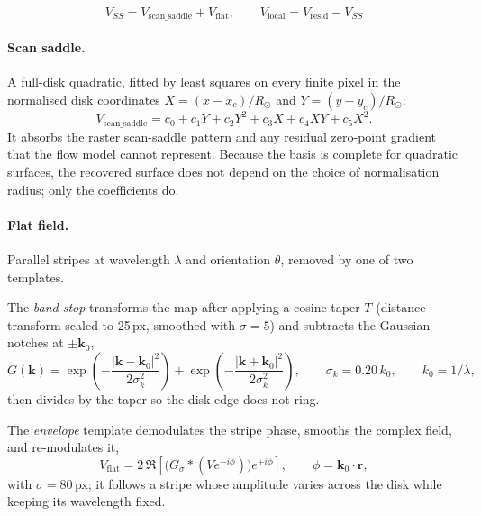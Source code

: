 \documentclass[11pt,a4paper]{article}
\begin{document}
\begin{equation}
  \boxed{\;V_{SS} = V_{\mathrm{scan\_saddle}} + V_{\mathrm{flat}},
  \qquad V_{\mathrm{local}} = V_{\mathrm{resid}} - V_{SS}\;}
  \label{eq:ss}
\end{equation}

\paragraph{Scan saddle.}  A full-disk quadratic, fitted by least squares on every
finite pixel in the normalised disk coordinates
$X=(x-x_c)/R_\odot$ and $Y=(y-y_c)/R_\odot$:
\begin{equation}
  V_{\mathrm{scan\_saddle}} = c_0 + c_1 Y + c_2 Y^2 + c_3 X + c_4 XY + c_5 X^2 .
\end{equation}
It absorbs the raster scan-saddle pattern and any residual zero-point gradient
that the flow model cannot represent.  Because the basis is complete for
quadratic surfaces, the recovered surface does not depend on the choice of
normalisation radius; only the coefficients do.

\paragraph{Flat field.}  Parallel stripes at wavelength $\lambda$ and
orientation $\theta$, removed by one of two templates.

The \emph{band-stop} transforms the map after applying a cosine taper
$T$ (distance transform scaled to 25\,px, smoothed with $\sigma=5$) and
subtracts the Gaussian notches at $\pm \bm{k}_0$,
\begin{equation}
  G(\bm{k}) = \exp\!\left(-\frac{|\bm{k}-\bm{k}_0|^2}{2\sigma_k^2}\right)
            + \exp\!\left(-\frac{|\bm{k}+\bm{k}_0|^2}{2\sigma_k^2}\right),
  \qquad \sigma_k = 0.20\,k_0,
  \qquad k_0 = 1/\lambda,
\end{equation}
then divides by the taper so the disk edge does not ring.

The \emph{envelope} template demodulates the stripe phase, smooths the complex
field, and re-modulates it,
\begin{equation}
  V_{\mathrm{flat}} = 2\,\Re\!\left[
    \big(G_{\sigma} * (V e^{-i\phi})\big) e^{+i\phi}\right],
  \qquad \phi = \bm{k}_0\cdot\bm{r},
\end{equation}
with $\sigma = 80$\,px; it follows a stripe whose amplitude varies across the
disk while keeping its wavelength fixed.
\end{document}
